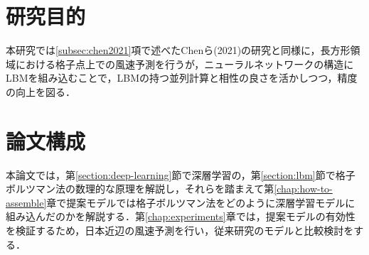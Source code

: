 



\section{研究目的}
本研究では\ref{subsec:chen2021}項で述べたChenら(2021)の研究と同様に，長方形領域における格子点上での風速予測を行うが，ニューラルネットワークの構造にLBMを組み込むことで，LBMの持つ並列計算と相性の良さを活かしつつ，精度の向上を図る．%


\section{論文構成}
本論文では，第\ref{section:deep-learning}節で深層学習の，第\ref{section:lbm}節で格子ボルツマン法の数理的な原理を解説し，それらを踏まえて第\ref{chap:how-to-assemble}章で提案モデルでは格子ボルツマン法をどのように深層学習モデルに組み込んだのかを解説する．第\ref{chap:experiments}章では，提案モデルの有効性を検証するため，日本近辺の風速予測を行い，従来研究のモデルと比較検討をする．